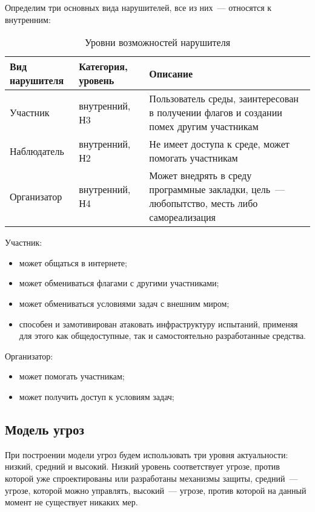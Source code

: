 Определим три основных вида нарушителей, все из них~--- относятся к внутренним:

  \begin{longtable}{|p{}|p{}|p{}|}
    \caption{Уровни возможностей нарушителя}
    \label{tab:badpeople}
    \\ \hline
    \textbf{Вид нарушителя} & \textbf{Категория, уровень} & \textbf{Описание}
    \\ \hline \endhead
    Участник & внутренний, Н3 & Пользователь среды, заинтересован в получении флагов и создании помех другим участникам
    \\ \hline
    Наблюдатель & внутренний, Н2 & Не имеет доступа к среде, может помогать участникам
    \\ \hline
    Организатор & внутренний, Н4 & Может внедрять в среду программные закладки, цель~--- любопытство, месть либо самореализация
    \\ \hline
  \end{longtable}

Участник:
\begin{itemize}
\item
  может общаться в интернете;
\item
  может обмениваться флагами с другими участниками;
\item
  может обмениваться условиями задач с внешним миром;
\item
  способен и замотивирован атаковать инфраструктуру испытаний, применяя для этого как общедоступные, так и самостоятельно разработанные средства.
\end{itemize}

Организатор:
\begin{itemize}
\item может помогать участникам;
\item может получить доступ к условиям задач;
\end{itemize}

\subsection{Модель угроз}

При построении модели угроз будем использовать три уровня актуальности: низкий, средний и высокий. Низкий уровень соответствует угрозе, против которой уже спроектированы или разработаны механизмы защиты, средний~--- угрозе, которой можно управлять, высокий~--- угрозе, против которой на данный момент не существует никаких мер.

